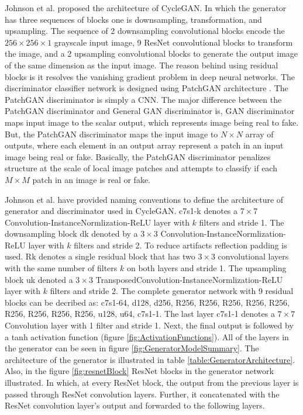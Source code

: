 Johnson et al.\cite{johnson2016perceptual} proposed the architecture of \ac{CycleGAN}. In which the generator has three sequences of blocks one is downsampling, transformation, and upsampling. The sequence of 2 downsampling convolutional blocks encode the $256 \times 256 \times 1$ grayscale input image, 9 \ac{ResNet} convolutional blocks to transform the image, and a 2 upsampling convolutional blocks to generate the output image of the same dimension as the input image. The reason behind using residual blocks is it resolves the vanishing gradient problem in deep neural networks. The discriminator classifier network is designed using PatchGAN architecture \cite{isola2018imagetoimage} \cite{li2016precomputed}. The PatchGAN discriminator is simply a \ac{CNN}. The major difference between the PatchGAN discriminator and General \ac{GAN} discriminator is, \ac{GAN} discriminator maps input image to the scalar output, which represents image being real to fake. But, the PatchGAN discriminator maps the input image to $N \times N$ array of outputs, where each element in an output array represent a patch in an input image being real or fake. Basically, the PatchGAN discriminator penalizes structure at the scale of local image patches and attempts to classify if each $M \times M$ patch in an image is real or fake.

Johnson et al. \cite{johnson2016perceptual} have provided naming conventions to define the architecture of generator and discriminator used in \ac{CycleGAN}. {\selectfont c7s1-k} denotes a $7 \times 7$ Convolution-InstanceNormlization-ReLU layer with $k$ filters and stride 1. The downsampling block {\selectfont dk} denoted by a $3 \times 3$ Convolution-InstanceNormlization-ReLU layer with $k$ filters and stride 2. To reduce artifacts reflection padding is used. {\selectfont Rk} denotes a single residual block that has two $3 \times 3$ convolutional layers with the same number of filters $k$ on both layers and stride 1. The upsampling block {\selectfont uk} denoted a $3 \times 3$ TransposedConvolution-InstanceNormlization-ReLU layer with $k$ filters and stride 2. The complete generator network with 9 residual blocks can be decribed as: {\selectfont c7s1-64, d128, d256, R256, R256, R256, R256, R256, R256, R256, R256, R256, u128, u64, c7s1-1}. The last layer {\selectfont c7s1-1} denotes a $7 \times 7$ Convolution layer with 1 filter and stride 1. Next, the final output is followed by a tanh activation function (figure \ref{fig:ActivationFunctions}). All of the layers in the generator can be seen in figure \ref{fig:GeneratorModelSummary}. The architecture of the generator is illustrated in table \ref{table:GeneratorArchitecture}. Also, in the figure \ref{fig:resnetBlock} \ac{ResNet} blocks in the generator network illustrated. In which, at every \ac{ResNet} block, the output from the previous layer is passed through \ac{ResNet} convolution layers. Further, it concatenated with the \ac{ResNet} convolution layer's output and forwarded to the following layers.

